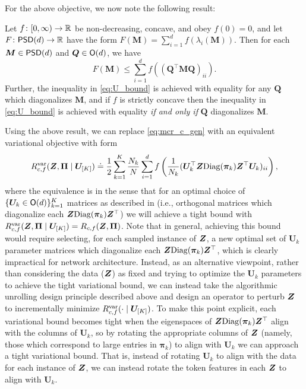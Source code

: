 \documentclass[../../book-main.tex]{subfiles}
\begin{document}
For the above objective, we now note the following result:
\begin{theorem}
\label{thm:var_concave}
    Let \(f \colon [0, \infty) \to \mathbb{R}\) be non-decreasing, concave, and obey \(f(0) = 0\), and let \(F \colon \mathsf{PSD}(d) \to \mathbb{R}\) have the form \(F(\bm M) = \sum_{i = 1}^{d}f(\lambda_{i}(\bm M))\). Then for each \(\bm M \in \mathsf{PSD}(d)\) and \(\bm Q \in \mathsf{O}(d)\), we have
    \begin{equation}
        \label{eq:U_bound}
        F(\bm M) \leq  \sum_{i=1}^{d} f\left( (\bm Q^{\top} \bm M \bm Q)_{ii} \right).
    \end{equation}
    Further, the inequality in \eqref{eq:U_bound} is achieved with equality for any $\bm Q$ which diagonalizes $\bm M$, and if $f$ is strictly concave then the inequality in \eqref{eq:U_bound} is achieved with equality \textit{if and only if} $\bm Q$ diagonalizes $\bm M$. 
\end{theorem}

Using the above result, we can replace \eqref{eq:mcr_c_gen} with an equivalent variational objective with form
\vspace{-2mm}
\begin{equation}
    \label{eq:var_comp}
    R^{\rm var}_{c,f} (\bm{Z},\bm \Pi \mid \bm U_{[K]}) \doteq \frac{1}{2}\sum_{k=1}^K \frac{N_k}{N} \sum_{i=1}^{d} f\left(\frac{1}{N_k} (\bm U_{k}^{\top} \bm{Z} \mathrm{Diag}(\bm \pi_k) \bm Z^{\top} \bm U_{k})_{ii} \right),
\end{equation}
where the equivalence is in the sense that for an optimal choice of $\{ \bm U_k \in \mathsf{O}(d)\}_{k=1}^K$ matrices as described in  (i.e., orthogonal matrices which diagonalize each $\bm{Z} \mathrm{Diag}(\bm \pi_k) \bm{Z}^\top $) we will achieve a tight bound with $ R^{\rm var}_{c,f} (\bm{Z},\bm \Pi \mid \bm U_{[K]}) = R_{c,f} (\bm{Z},\bm \Pi)$. Note that in general, achieving this bound would require selecting, for each sampled instance of $\bm{Z}$, a new optimal set of $\bm U_{k}$ parameter matrices which diagonalize each $\bm{Z}\mathrm{Diag}(\bm \pi_{k})\bm{Z}^{\top}$, which is clearly impractical for network architecture. 
Instead, as an alternative viewpoint, rather than considering the data ($\bm{Z}$) as fixed and trying to optimize the $\bm U_k$ parameters to achieve the tight variational bound, we can instead take the algorithmic unrolling design principle described above and design an operator to perturb $\bm{Z}$ to incrementally minimize $R_{c, f}^{\rm var}(\cdot \mid \bm U_{[K]})$.  To make this point explicit, each variational bound becomes tight when the eigenspaces of $\bm{Z} \mathrm{Diag}(\bm \pi_k) \bm{Z}
^\top$ align with the columns of $\bm U_k$, so by rotating the appropriate columns of $\bm{Z}$ (namely, those which correspond to large entries in $\bm \pi_k$) to align with $\bm U_k$ we can approach a tight variational bound. That is, instead of rotating $\bm U_k$ to align with the data for each instance of $\bm{Z}$, we can instead rotate the token features in each $\bm{Z}$ to align with $\bm U_k$. 
\end{document}
